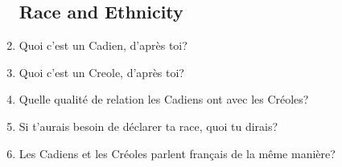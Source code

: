 \begin{enumerate}
  \subsection{Race and Ethnicity}
    \item Quoi c'est un Cadien, d'après toi? \\
    \item Quoi c'est un Creole, d'après toi? \\
    \item Quelle qualité de relation les Cadiens ont avec les Créoles? \\
    \item Si t'aurais besoin de déclarer ta race, quoi tu dirais? \\
    \item Les Cadiens et les Créoles parlent français de la même manière? \\

\end{enumerate}
